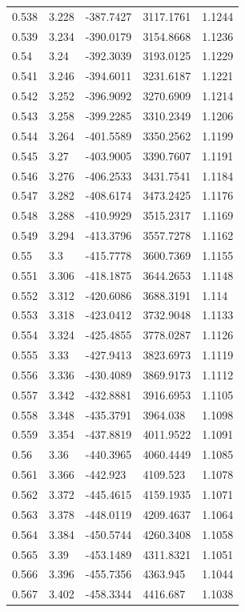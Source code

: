 \begin{tabular}{lllll}
0.538 & 3.228 & -387.7427 & 3117.1761 & 1.1244 \\
0.539 & 3.234 & -390.0179 & 3154.8668 & 1.1236 \\
0.54 & 3.24 & -392.3039 & 3193.0125 & 1.1229 \\
0.541 & 3.246 & -394.6011 & 3231.6187 & 1.1221 \\
0.542 & 3.252 & -396.9092 & 3270.6909 & 1.1214 \\
0.543 & 3.258 & -399.2285 & 3310.2349 & 1.1206 \\
0.544 & 3.264 & -401.5589 & 3350.2562 & 1.1199 \\
0.545 & 3.27 & -403.9005 & 3390.7607 & 1.1191 \\
0.546 & 3.276 & -406.2533 & 3431.7541 & 1.1184 \\
0.547 & 3.282 & -408.6174 & 3473.2425 & 1.1176 \\
0.548 & 3.288 & -410.9929 & 3515.2317 & 1.1169 \\
0.549 & 3.294 & -413.3796 & 3557.7278 & 1.1162 \\
0.55 & 3.3 & -415.7778 & 3600.7369 & 1.1155 \\
0.551 & 3.306 & -418.1875 & 3644.2653 & 1.1148 \\
0.552 & 3.312 & -420.6086 & 3688.3191 & 1.114 \\
0.553 & 3.318 & -423.0412 & 3732.9048 & 1.1133 \\
0.554 & 3.324 & -425.4855 & 3778.0287 & 1.1126 \\
0.555 & 3.33 & -427.9413 & 3823.6973 & 1.1119 \\
0.556 & 3.336 & -430.4089 & 3869.9173 & 1.1112 \\
0.557 & 3.342 & -432.8881 & 3916.6953 & 1.1105 \\
0.558 & 3.348 & -435.3791 & 3964.038 & 1.1098 \\
0.559 & 3.354 & -437.8819 & 4011.9522 & 1.1091 \\
0.56 & 3.36 & -440.3965 & 4060.4449 & 1.1085 \\
0.561 & 3.366 & -442.923 & 4109.523 & 1.1078 \\
0.562 & 3.372 & -445.4615 & 4159.1935 & 1.1071 \\
0.563 & 3.378 & -448.0119 & 4209.4637 & 1.1064 \\
0.564 & 3.384 & -450.5744 & 4260.3408 & 1.1058 \\
0.565 & 3.39 & -453.1489 & 4311.8321 & 1.1051 \\
0.566 & 3.396 & -455.7356 & 4363.945 & 1.1044 \\
0.567 & 3.402 & -458.3344 & 4416.687 & 1.1038 \\

\end{tabular}
